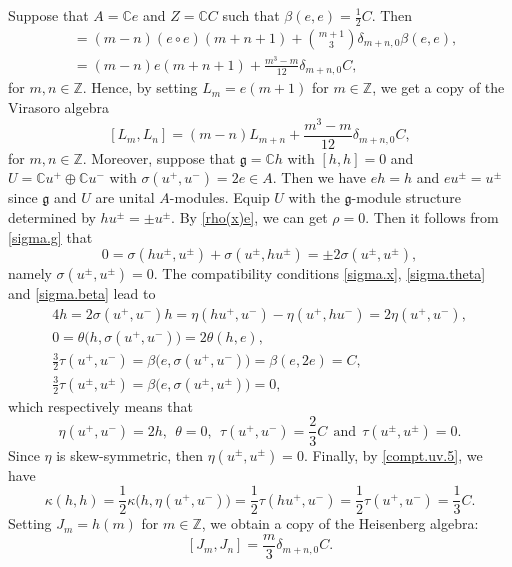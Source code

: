\documentclass[12pt]{article}
\numberwithin{equation}{section}
\theoremstyle{definition}
\theoremstyle{plain}
\newcommand{\bC}{\ensuremath{\mathbb{C}}}
\newcommand{\bZ}{\ensuremath{\mathbb{Z}}}
\newcommand{\fg}{\mathfrak{g}}
\begin{document}
Suppose that $A=\bC e$ and $Z=\bC C$ such that $\beta(e,e)=\frac{1}{2}C$. Then
\begin{align*}
    [e(m+1),e(n+1)]&=(m-n)(e\circ e)(m+n+1)+\binom{m+1}{3}\delta_{m+n,0}\beta(e,e),\\
    &=(m-n)e(m+n+1)+\frac{m^3-m}{12}\delta_{m+n,0}C,
\end{align*}
for $m,n\in\bZ$. Hence, by setting $L_m=e(m+1)$ for $m\in\bZ$, we get a copy of the Virasoro algebra
\begin{equation}\label{N2.L}
    [L_m,L_n]=(m-n)L_{m+n}+\frac{m^3-m}{12}\delta_{m+n,0}C,
\end{equation}
for $m,n\in\bZ$. Moreover, suppose that $\fg=\bC h$ with $[h,h]=0$ and $U=\bC u^+\oplus\bC u^-$ with $\sigma(u^+,u^-)=2e\in A$. Then we have $eh=h$ and $eu^\pm=u^\pm$ since $\fg$ and $U$ are unital $A$-modules. Equip $U$ with the $\fg$-module structure determined by $hu^\pm=\pm u^\pm$. By \eqref{rho(x)e}, we can get $\rho=0$. Then it follows from \eqref{sigma.g} that
\begin{equation*}
    0=\sigma(hu^\pm,u^\pm)+\sigma(u^\pm,hu^\pm)=\pm2\sigma(u^\pm,u^\pm),
\end{equation*}
namely $\sigma(u^\pm,u^\pm)=0$. The compatibility conditions \eqref{sigma.x}, \eqref{sigma.theta} and \eqref{sigma.beta} lead to
\begin{gather*}
    4h=2\sigma(u^+,u^-)h=\eta(hu^+,u^-)-\eta(u^+,hu^-)=2\eta(u^+,u^-),\\
    0=\theta\big(h,\sigma(u^+,u^-)\big)=2\theta(h,e),\\
    \frac{3}{2}\tau(u^+,u^-)=\beta\big(e,\sigma(u^+,u^-)\big)=\beta(e,2e)=C,\\
    \frac{3}{2}\tau(u^\pm,u^\pm)=\beta\big(e,\sigma(u^\pm,u^\pm)\big)=0,
\end{gather*}
which respectively means that
\begin{equation*}
    \eta(u^+,u^-)=2h,\ \ \theta=0,\ \ \tau(u^+,u^-)=\frac{2}{3}C\ \ \text{and}\ \ \tau(u^\pm,u^\pm)=0.
\end{equation*}
Since $\eta$ is skew-symmetric, then $\eta(u^\pm,u^\pm)=0.$ Finally, by \eqref{compt.uv.5}, we have
\begin{equation*}
    \kappa(h,h)=\frac{1}{2}\kappa\big(h,\eta(u^+,u^-)\big)=\frac{1}{2}\tau(hu^+,u^-)=\frac{1}{2}\tau(u^+,u^-)=\frac{1}{3}C.
\end{equation*}
Setting $J_m=h(m)$ for $m\in\bZ$, we obtain a copy of the Heisenberg algebra:
\begin{equation}\label{N2.J}
    [J_m,J_n]=\frac{m}{3}\delta_{m+n,0}C.
\end{equation}
\end{document}
